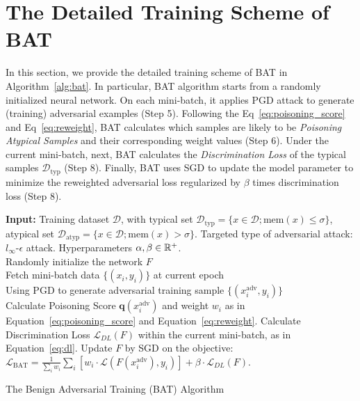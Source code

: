 
\section{The Detailed Training Scheme of BAT}\label{app:algorithm}

In this section, we provide the detailed training scheme of BAT in Algorithm~\ref{alg:bat}. In particular, BAT algorithm starts from a randomly initialized neural network. On each mini-batch, it applies PGD attack to generate (training) adversarial examples (Step 5). Following the Eq~\ref{eq:poisoning_score} and Eq~\ref{eq:reweight}, BAT calculates which samples are likely to be \textit{Poisoning Atypical Samples} and their corresponding weight values (Step 6). Under the current mini-batch, next, BAT calculates the \textit{Discrimination Loss} of the typical samples $\mathcal{D}_\text{typ}$ (Step 8). Finally, BAT uses SGD to update the model parameter to minimize the reweighted adversarial loss regularized by $\beta$ times discrimination loss (Step 8).

\begin{algorithm}[h!]
\begin{algorithmic}[1]
\STATE \textbf{Input:} Training dataset $\mathcal{D}$, with typical set $\mathcal{D}_\text{typ} = \{x \in\mathcal{D}; \text{mem}(x) \leq \sigma\}$, atypical set $\mathcal{D}_\text{atyp} = \{x \in\mathcal{D}; \text{mem}(x) > \sigma\}$. Targeted type of adversarial attack: $l_\infty$-$\epsilon$ attack.
Hyperparameters $\alpha, \beta \in \mathbb{R}^+$. \\
\STATE Randomly initialize the network $F$ \\
\REPEAT
\STATE Fetch mini-batch data $\{(x_i,y_i)\}$ at current epoch\\
\STATE Using PGD to generate adversarial training sample  $\{(x_i^\text{adv},y_i)\}$\\
\STATE Calculate Poisoning Score $\textbf{q}(x^\text{adv}_i)$ and weight $w_i$ as in Equation~\ref{eq:poisoning_score} and Equation~\ref{eq:reweight}.
\STATE Calculate Discrimination Loss $\mathcal{L}_{DL}(F)$ within the current mini-batch, as in Equation~\ref{eq:dl}.
\STATE Update $F$ by SGD on the objective: $\mathcal{L}_\text{BAT} = \frac{1}{\sum_i w_i }\sum_i \left[w_i \cdot \mathcal{L}(F(x_i^\text{adv}), y_i)\right] + \beta\cdot\mathcal{L}_{DL}(F)$.
\caption{The Benign Adversarial Training (BAT) Algorithm}
\label{alg:bat}
\end{algorithmic}
\end{algorithm}



